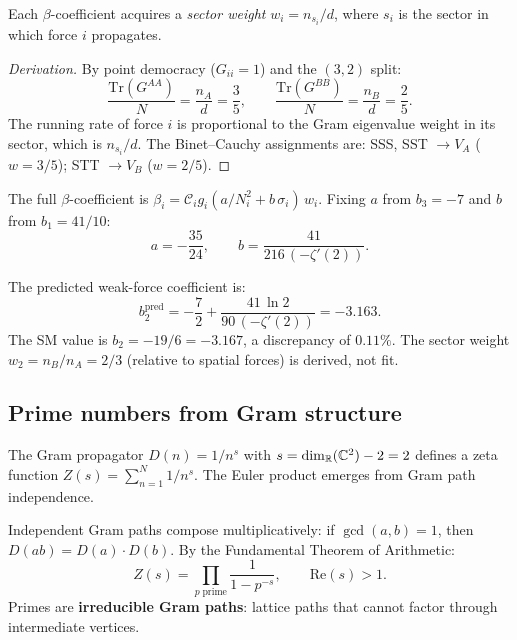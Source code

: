 Each $\beta$-coefficient acquires a \emph{sector weight} $w_i = n_{s_i}/d$, where $s_i$ is the sector in which force $i$ propagates.

\begin{proof}[Derivation]
By point democracy ($G_{ii} = 1$) and the $(3,2)$ split:
\begin{equation}
\frac{\mathrm{Tr}(G^{AA})}{N} = \frac{n_A}{d} = \frac{3}{5}, \qquad \frac{\mathrm{Tr}(G^{BB})}{N} = \frac{n_B}{d} = \frac{2}{5}.
\end{equation}
The running rate of force $i$ is proportional to the Gram eigenvalue weight in its sector, which is $n_{s_i}/d$.  The Binet--Cauchy assignments are: SSS, SST $\to V_A$ ($w = 3/5$); STT $\to V_B$ ($w = 2/5$).
\end{proof}

The full $\beta$-coefficient is $\beta_i = \mathcal{C}_i g_i (a/N_i^2 + b\,\sigma_i)\,w_i$.  Fixing $a$ from $b_3 = -7$ and $b$ from $b_1 = 41/10$:
\begin{equation}
a = -\frac{35}{24}, \qquad b = \frac{41}{216\,(-\zeta'(2))}.
\end{equation}

The predicted weak-force coefficient is:
\begin{equation}
\boxed{b_2^{\mathrm{pred}} = -\frac{7}{2} + \frac{41\,\ln 2}{90\,(-\zeta'(2))} = -3.163.}
\end{equation}
The SM value is $b_2 = -19/6 = -3.167$, a discrepancy of $0.11\%$.  The sector weight $w_2 = n_B/n_A = 2/3$ (relative to spatial forces) is derived, not fit.

\subsection{Prime numbers from Gram structure}
\label{sec:primes}

The Gram propagator $D(n) = 1/n^s$ with $s = \dim_{\mathbb{R}}(\mathbb{C}^2) - 2 = 2$ defines a zeta function $Z(s) = \sum_{n=1}^N 1/n^s$.  The Euler product emerges from Gram path independence.

\begin{theorem}
\label{thm:euler_product}
Independent Gram paths compose multiplicatively: if $\gcd(a,b)=1$, then $D(ab)=D(a)\cdot D(b)$.  By the Fundamental Theorem of Arithmetic:
\begin{equation}
Z(s) = \prod_{p\;\mathrm{prime}} \frac{1}{1-p^{-s}}, \qquad \mathrm{Re}(s)>1.
\end{equation}
Primes are \textbf{irreducible Gram paths}: lattice paths that cannot factor through intermediate vertices.
\end{theorem}


